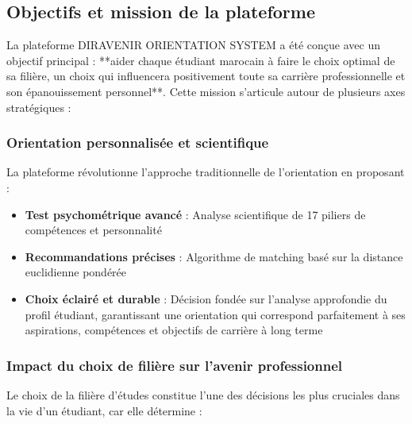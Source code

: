 \documentclass[12pt,a4paper]{report}
\begin{document}
\subsection{Objectifs et mission de la plateforme}

La plateforme DIRAVENIR ORIENTATION SYSTEM a été conçue avec un objectif principal : **aider chaque étudiant marocain à faire le choix optimal de sa filière, un choix qui influencera positivement toute sa carrière professionnelle et son épanouissement personnel**. Cette mission s'articule autour de plusieurs axes stratégiques :

\subsubsection{Orientation personnalisée et scientifique}

La plateforme révolutionne l'approche traditionnelle de l'orientation en proposant :
\begin{itemize}
    \item \textbf{Test psychométrique avancé} : Analyse scientifique de 17 piliers de compétences et personnalité
    \item \textbf{Recommandations précises} : Algorithme de matching basé sur la distance euclidienne pondérée
    \item \textbf{Choix éclairé et durable} : Décision fondée sur l'analyse approfondie du profil étudiant, garantissant une orientation qui correspond parfaitement à ses aspirations, compétences et objectifs de carrière à long terme
\end{itemize}

\subsubsection{Impact du choix de filière sur l'avenir professionnel}

Le choix de la filière d'études constitue l'une des décisions les plus cruciales dans la vie d'un étudiant, car elle détermine :
\end{document}
